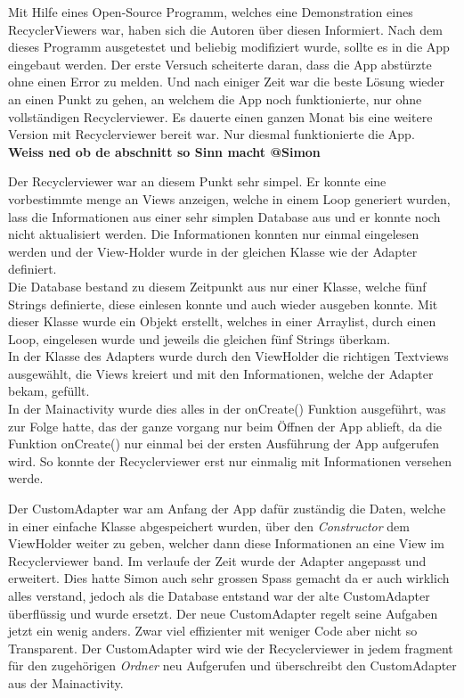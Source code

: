 \documentclass[a4paper,11pt]{article}
\begin{document}
Mit Hilfe eines Open-Source Programm, welches eine Demonstration eines RecyclerViewers war, haben sich die Autoren über diesen Informiert. \cite{RecViewApp}
Nach dem dieses Programm ausgetestet und beliebig modifiziert wurde, sollte es in die App eingebaut werden. 
Der erste Versuch scheiterte daran,
dass die App abstürzte ohne einen Error zu melden. Und nach einiger Zeit war die beste Lösung wieder an einen Punkt zu gehen, an welchem die App noch funktionierte, nur ohne vollständigen 
Recyclerviewer. Es dauerte einen ganzen Monat bis eine weitere Version mit Recyclerviewer bereit war. Nur diesmal funktionierte die App. \\

\textbf{Weiss ned ob de abschnitt so Sinn macht @Simon}

Der Recyclerviewer war an diesem Punkt sehr simpel. Er konnte eine vorbestimmte menge an Views anzeigen, welche in einem Loop generiert wurden, lass die Informationen aus
einer sehr simplen Database aus und er konnte noch nicht aktualisiert werden. Die Informationen konnten nur einmal eingelesen werden und der View-Holder wurde in der gleichen Klasse wie 
der Adapter definiert. \\

Die Database bestand zu diesem Zeitpunkt aus nur einer Klasse, welche fünf Strings definierte, diese einlesen konnte und auch wieder ausgeben konnte. Mit dieser Klasse wurde
ein Objekt erstellt, welches in einer Arraylist, durch einen Loop, eingelesen wurde und jeweils die gleichen fünf Strings überkam. \\

In der Klasse des Adapters wurde durch den ViewHolder die richtigen Textviews ausgewählt, die Views kreiert und mit den Informationen, welche der Adapter bekam, gefüllt. \\

In der Mainactivity wurde dies alles in der onCreate() Funktion ausgeführt, was zur Folge hatte, das der ganze vorgang nur beim Öffnen der App ablieft, da die Funktion onCreate()
nur einmal bei der ersten Ausführung der App aufgerufen wird. So konnte der Recyclerviewer erst nur einmalig mit Informationen versehen werde.

Der CustomAdapter war am Anfang der App dafür zuständig die Daten, welche in einer einfache Klasse abgespeichert wurden, über den 
\textit{Constructor} dem ViewHolder weiter zu geben, welcher dann diese Informationen an eine View im Recyclerviewer band. Im verlaufe der Zeit wurde 
der Adapter angepasst und erweitert. Dies hatte Simon auch sehr grossen Spass gemacht da er auch wirklich alles verstand, jedoch als die Database entstand war der alte 
CustomAdapter überflüssig und wurde ersetzt. Der neue CustomAdapter regelt seine Aufgaben jetzt ein wenig anders. Zwar viel effizienter mit weniger Code aber nicht 
so Transparent. Der CustomAdapter wird wie der Recyclerviewer in jedem \gls{fragment} für den zugehörigen \textit{Ordner} neu Aufgerufen und überschreibt den CustomAdapter 
aus der Mainactivity. 
\end{document}
